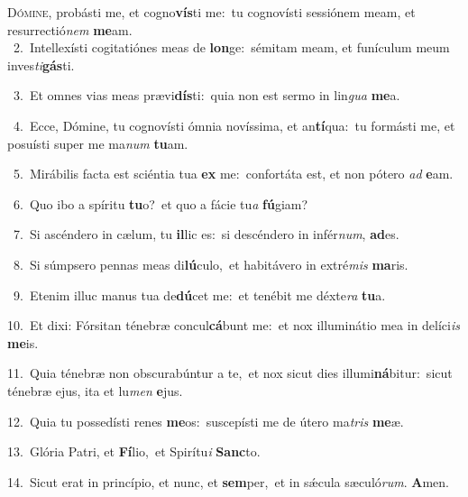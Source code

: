 \lettrine{\initial\textcolor{\initialcolor}{D}}{ómine,} probásti me, et cogno\-\textbf{vís}\-ti me:~\star tu cognovísti sessiónem meam, et resurrectió\textit{nem} \textbf{me}\-am.\\
{\numbfont\textcolor{\numbcolor}{~2.}}~Intellexísti cogitatiónes meas de \textbf{lon}\-ge:~\star sémitam meam, et funículum meum inves\-\textit{ti}\-\textbf{gás}ti.\par
{\numbfont\textcolor{\numbcolor}{~3.}}~Et omnes vias meas prævi\-\textbf{dís}\-ti:~\star quia non est sermo in lin\textit{gua} \textbf{me}\-a.\par
{\numbfont\textcolor{\numbcolor}{~4.}}~Ecce, Dómine, tu cognovísti ómnia novíssima, et an\-\textbf{tí}\-qua:~\star tu formásti me, et posuísti super me ma\textit{num} \textbf{tu}\-am.\par
{\numbfont\textcolor{\numbcolor}{~5.}}~Mirábilis facta est sciéntia tua \textbf{ex} me:~\star confortáta est, et non pótero \textit{ad} \textbf{e}\-am.\par
{\numbfont\textcolor{\numbcolor}{~6.}}~Quo ibo a spíritu \textbf{tu}\-o?~\star et quo a fácie tu\textit{a} \textbf{fú}\-giam?\par
{\numbfont\textcolor{\numbcolor}{~7.}}~Si ascéndero in cælum, tu \textbf{il}\-lic es:~\star si descéndero in infér\-\textit{num}\-, \textbf{ad}\-es.\par
{\numbfont\textcolor{\numbcolor}{~8.}}~Si súmpsero pennas meas di\-\textbf{lú}\-culo,~\star et habitávero in extré\textit{mis} \textbf{ma}\-ris.\par
{\numbfont\textcolor{\numbcolor}{~9.}}~Etenim illuc manus tua de\-\textbf{dú}\-cet me:~\star et tenébit me déxte\textit{ra} \textbf{tu}\-a.\par
{\numbfont\textcolor{\numbcolor}{10.}}~Et dixi: Fórsitan ténebræ concul\-\textbf{cá}\-bunt me:~\star et nox illuminátio mea in delíci\textit{is} \textbf{me}\-is.\par
{\numbfont\textcolor{\numbcolor}{11.}}~Quia ténebræ non obscurabúntur a te,~\dagger et nox sicut dies illumi\-\textbf{ná}\-bitur:~\star sicut ténebræ ejus, ita et lu\textit{men} \textbf{e}\-jus.\par
{\numbfont\textcolor{\numbcolor}{12.}}~Quia tu possedísti renes \textbf{me}\-os:~\star suscepísti me de útero ma\textit{tris} \textbf{me}\-æ.\par
{\numbfont\textcolor{\numbcolor}{13.}}~Glória Patri, et \textbf{Fí}\-lio,~\star et Spirítu\textit{i} \textbf{Sanc}\-to.\par
{\numbfont\textcolor{\numbcolor}{14.}}~Sicut erat in princípio, et nunc, et \textbf{sem}\-per,~\star et in sǽcula sæculó\-\textit{rum}\-. \textbf{A}\-men.\par
